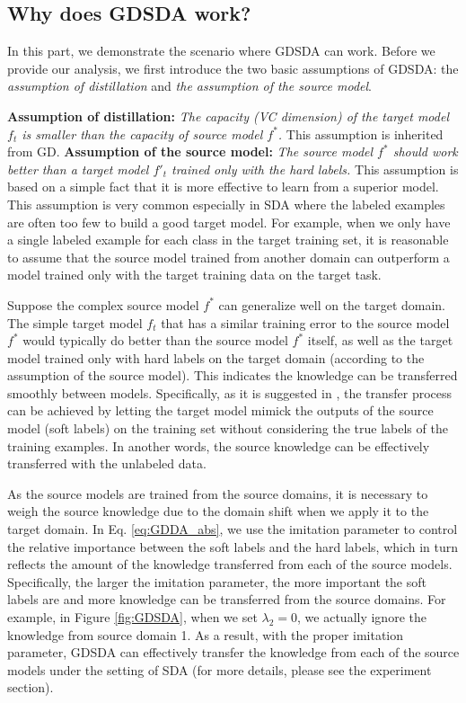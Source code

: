 \subsection{Why does GDSDA work?}
In this part, we demonstrate the scenario where GDSDA can work. Before we provide our analysis, we first introduce the two basic assumptions of GDSDA: the \textit{assumption of distillation} and \textit{the assumption of the source model}.

\textbf{Assumption of distillation:} \textit{The capacity (VC dimension) of the target model $f_t$ is smaller than the capacity of source model $f^*$.} This assumption is inherited from GD.
\textbf{Assumption of the source model:} \textit{The source model $f^*$ should work better than a target model $f'_t$ trained only with the hard labels.} 
This assumption is based on a simple fact that it is more effective to learn from a superior model. This assumption is very common especially in SDA where the labeled examples are often too few to build a good target model.
For example, when we only have a single labeled example for each class in the target training set, it is reasonable to assume that the source model trained from another domain can outperform a model trained only with the target training data on the target task. %

Suppose the complex source model $f^*$ can generalize well on the target domain. The simple target model $f_t$ that has a similar training error to the source model $f^*$ would typically do better than the source model $f^*$ itself, as well as the target model trained only with hard labels on the target domain (according to the assumption of the source model). This indicates the knowledge can be transferred smoothly between models. Specifically, as it is suggested in \cite{hinton2015distilling}, the transfer process can be achieved by letting the target model mimick the outputs of the source model (soft labels) on the training set without considering the true labels of the training examples. In another words, the source knowledge can be effectively transferred with the unlabeled data.

As the source models are trained from the source domains, it is necessary to weigh the source knowledge due to the domain shift\cite{karl2001long} when we apply it to the target domain. In Eq. \eqref{eq:GDDA_abs}, we use the imitation parameter to control the relative importance between the soft labels and the hard labels, which in turn reflects the amount of the knowledge transferred from each of the source models. Specifically, the larger the imitation parameter, the more important the soft labels are and more knowledge can be transferred from the source domains. 
For example, in Figure \ref{fig:GDSDA}, when we set $\lambda_2=0$, we actually ignore the knowledge from source domain 1.
As a result, with the proper imitation parameter, GDSDA can effectively transfer the knowledge from each of the source models under the setting of SDA (for more details, please see the experiment section).

